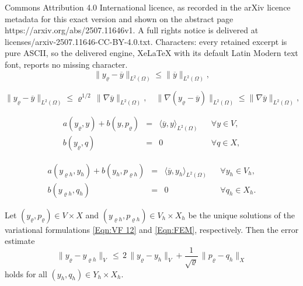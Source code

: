 \documentclass[10pt,a4paper]{amsart}
\begin{document}
Commons Attribution 4.0 International licence, as recorded in the arXiv licence metadata for this exact version and shown on the abstract page https://arxiv.org/abs/2507.11646v1. A full rights notice is delivered at licenses/arxiv-2507.11646-CC-BY-4.0.txt. Characters: every retained excerpt is pure ASCII, so the delivered engine, XeLaTeX with its default Latin Modern text font, reports no missing character.
\begin{equation}\label{Eqn:Regularization error L2}
  \| y_\varrho - \overline{y} \|_{L^2(\Omega)} \leq
  \| \overline{y} \|_{L^2(\Omega)}, 
\end{equation}

\begin{equation}\label{Eqn:Regularization error Y}
  \| y_\varrho - \overline{y} \|_{L^2(\Omega)} \leq
  \varrho^{1/2} \, \| \nabla \overline{y} \|_{L^2(\Omega)}, \quad
  \| \nabla (y_\varrho - \overline{y}) \|_{L^2(\Omega)} \leq
  \| \nabla \overline{y} \|_{L^2(\Omega)}, 
\end{equation}

\begin{equation}\label{Eqn:VF 12}
  \begin{array}{lclcl}
    a(y_\varrho,y) + b(y,p_\varrho)
    & = & \langle \overline{y},y \rangle_{L^2(\Omega)}
    && \forall y \in V, \\[1mm]
    b(y_\varrho,q) & = & 0 & & \forall q \in X,
  \end{array}
\end{equation}

\begin{equation}\label{Eqn:FEM}
  \begin{array}{lclcl}
    a(y_{\varrho h},y_h) + b(y_h,p_{\varrho h})
    & = & \langle \overline{y},y_h \rangle_{L^2(\Omega)}
    && \forall y_h \in V_h, \\[1mm]
    b(y_{\varrho h},q_h) & = & 0 & & \forall q_h \in X_h.
  \end{array}
\end{equation}

\begin{lemma}
  Let $(y_\varrho,p_\varrho) \in V \times X$ and
  $(y_{\varrho h},p_{\varrho h}) \in V_h \times X_h$ be the unique
  solutions of the variational formulations \eqref{Eqn:VF 12} and
  \eqref{Eqn:FEM}, respectively. Then 
  the error estimate
  \begin{equation}\label{Eqn:Cea}
    \| y_\varrho -y_{\varrho h}\|_V
    \, \leq \, 2 \,
    \| y_\varrho-y_h\|_V  +
    \frac{1}{\sqrt{\varrho}} \, \| p_\varrho-q_h \|_X
  \end{equation}
  holds for all $(y_h,q_h) \in Y_h \times X_h$.
\end{lemma}
\end{document}
